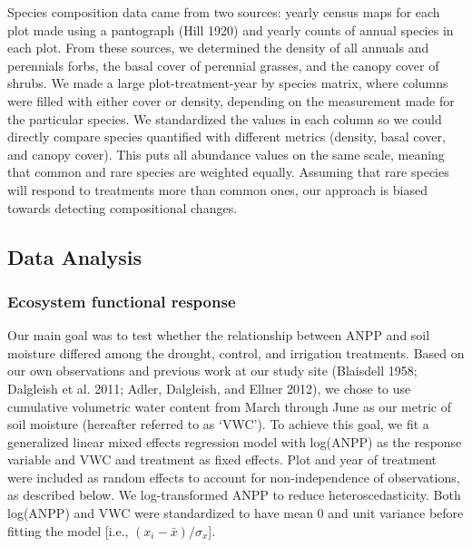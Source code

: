 \documentclass[fleqn,10pt,lineno]{wlpeerj} %
\begin{document}
Species composition data came from two sources: yearly census maps for
each plot made using a pantograph (Hill 1920) and yearly counts of
annual species in each plot. From these sources, we determined the
density of all annuals and perennials forbs, the basal cover of
perennial grasses, and the canopy cover of shrubs. We made a large
plot-treatment-year by species matrix, where columns were filled with
either cover or density, depending on the measurement made for the
particular species. We standardized the values in each column so we
could directly compare species quantified with different metrics
(density, basal cover, and canopy cover). This puts all abundance values
on the same scale, meaning that common and rare species are weighted
equally. Assuming that rare species will respond to treatments more than
common ones, our approach is biased towards detecting compositional
changes.

\hypertarget{data-analysis}{%
\subsection{Data Analysis}\label{data-analysis}}

\hypertarget{ecosystem-functional-response}{%
\subsubsection{Ecosystem functional
response}\label{ecosystem-functional-response}}

Our main goal was to test whether the relationship between ANPP and soil
moisture differed among the drought, control, and irrigation treatments.
Based on our own observations and previous work at our study site
(Blaisdell 1958; Dalgleish et al. 2011; Adler, Dalgleish, and Ellner
2012), we chose to use cumulative volumetric water content from March
through June as our metric of soil moisture (hereafter referred to as
`VWC'). To achieve this goal, we fit a generalized linear mixed effects
regression model with log(ANPP) as the response variable and VWC and
treatment as fixed effects. Plot and year of treatment were included as
random effects to account for non-independence of observations, as
described below. We log-transformed ANPP to reduce heteroscedasticity.
Both log(ANPP) and VWC were standardized to have mean 0 and unit
variance before fitting the model {[}i.e.,
\((x_i - \bar{x})/\sigma_x\){]}.
\end{document}
